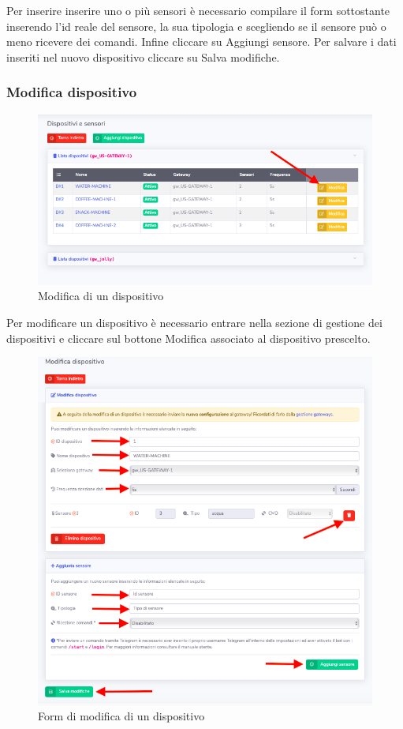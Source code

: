 		Per inserire inserire uno o più sensori è necessario compilare il form sottostante inserendo l'id reale del sensore, la sua tipologia e scegliendo se il sensore può o meno ricevere dei comandi. Infine cliccare su Aggiungi sensore.
		Per salvare i dati inseriti nel nuovo dispositivo cliccare su Salva modifiche.

	\subsubsection{Modifica dispositivo}

		\begin{figure}[H]
		\centering
		\includegraphics[scale=0.600]{res/images/admin/selModDisp.png}
		\caption{Modifica di un dispositivo}
	\end{figure}

		Per modificare un dispositivo è necessario entrare nella sezione di gestione dei dispositivi e cliccare sul bottone Modifica associato al dispositivo prescelto.

		\begin{figure}[H]
		\centering
		\includegraphics[scale=0.600]{res/images/admin/modDispositivo.png}
		\caption{Form di modifica di un dispositivo}
	\end{figure}

